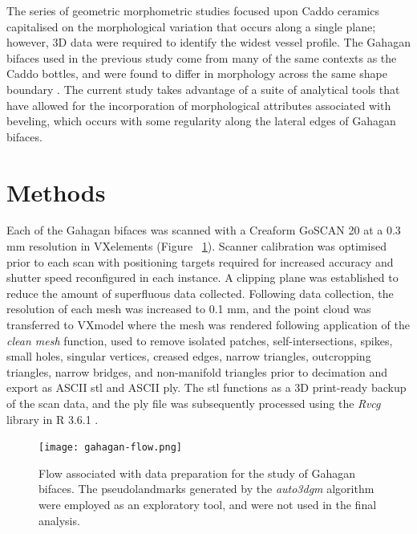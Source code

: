 \documentclass[review]{elsarticle}
\begin{document}
The series of geometric morphometric studies focused upon Caddo ceramics capitalised on the morphological variation that occurs along a single plane; however, 3D data were required to identify the widest vessel profile. The Gahagan bifaces used in the previous study come from many of the same contexts as the Caddo bottles, and were found to differ in morphology across the same shape boundary \citep[Figure 15.1]{RN11783,RN20852}. The current study takes advantage of a suite of  analytical tools that have allowed for the incorporation of morphological attributes associated with beveling, which occurs with some regularity along the lateral edges of Gahagan bifaces.

\section*{Methods}

Each of the Gahagan bifaces was scanned with a Creaform GoSCAN 20 at a 0.3 mm resolution in VXelements (Figure ~\ref{fig:figflow}). Scanner calibration was optimised prior to each scan with positioning targets required for increased accuracy and shutter speed reconfigured in each instance. A clipping plane was established to reduce the amount of superfluous data collected. Following data collection, the resolution of each mesh was increased to 0.1 mm, and the point cloud was transferred to VXmodel where the mesh was rendered following application of the \textit{clean mesh} function, used to remove isolated patches, self-intersections, spikes, small holes, singular vertices, creased edges, narrow triangles, outcropping triangles, narrow bridges, and non-manifold triangles prior to decimation and export as ASCII stl and ASCII ply. The stl functions as a 3D print-ready backup of the scan data, and the ply file was subsequently processed using the \textit{Rvcg} library in R 3.6.1 \citep{RN20849,R,RN20850}.

\begin{figure}[ht]\centering
\texttt{[image: gahagan-flow.png]}
\caption{Flow associated with data preparation for the study of Gahagan bifaces. The pseudolandmarks generated by the \textit{auto3dgm} algorithm were employed as an exploratory tool, and were not used in the final analysis.}
\label{fig:figflow}
\end{figure}
\end{document}

